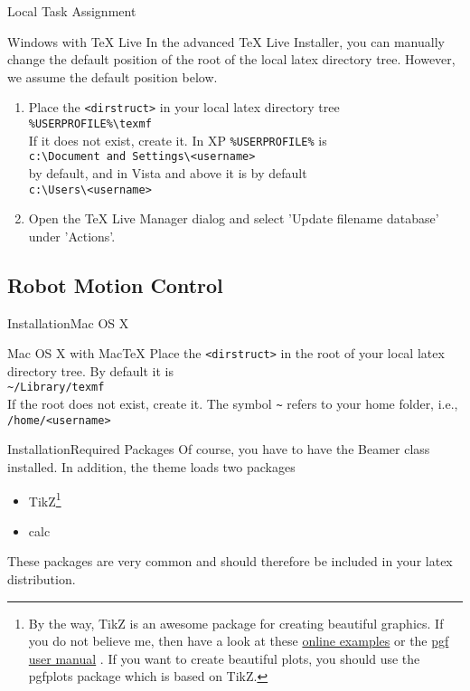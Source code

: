 \documentclass[10pt]{beamer}
\newcommand{\chref}[2]{%
  \href{#1}{{\usebeamercolor[bg]{AAUsimple}#2}}%
}
\begin{document}
\begin{frame}{Local Task Assignment}{}
  \begin{block}{Windows with TeX Live}
    In the advanced TeX Live Installer, you can manually change the default position of the root of the local latex directory tree. However, we assume the default position below.
    \begin{enumerate}
      \item Place the {\tt <dirstruct>} in your local latex directory tree\\
        {\tt \%USERPROFILE\%\textbackslash texmf}\\
        If it does not exist, create it. In XP {\tt \%USERPROFILE\%} is\\
      {\tt c:\textbackslash Document and Settings\textbackslash<username>}\\
      by default, and in Vista and above it is by default\\
      {\tt c:\textbackslash Users\textbackslash<username>}
      \item Open the TeX Live Manager dialog and select 'Update filename database' under 'Actions'.
    \end{enumerate}
  \end{block}
\end{frame}

\subsection{Robot Motion Control}
\begin{frame}{Installation}{Mac OS X}
  \begin{block}{Mac OS X with MacTeX}
     Place the {\tt <dirstruct>} in the root of your local latex directory tree. By default it is\\
        {\tt \textasciitilde /Library/texmf}\\
        If the root does not exist, create it. The symbol {\tt \textasciitilde} refers to your home folder, i.e., {\tt /home/<username>}
  \end{block}
\end{frame}

\begin{frame}{Installation}{Required Packages}
  Of course, you have to have the Beamer class installed. In addition, the theme loads two packages
  \begin{itemize}
    \item TikZ\footnote{By the way, TikZ is an awesome package for creating beautiful graphics. If you do not believe me, then have a look at these \chref{http://www.texample.net/tikz/examples/}{online examples} or the \chref{http://tug.ctan.org/tex-archive/graphics/pgf/base/doc/generic/pgf/pgfmanual.pdf}{pgf user manual}. If you want to create beautiful plots, you should use the pgfplots package which is based on TikZ.}
    \item calc
  \end{itemize}
  These packages are very common and should therefore be included in your latex distribution.
\end{frame}
\end{document}
